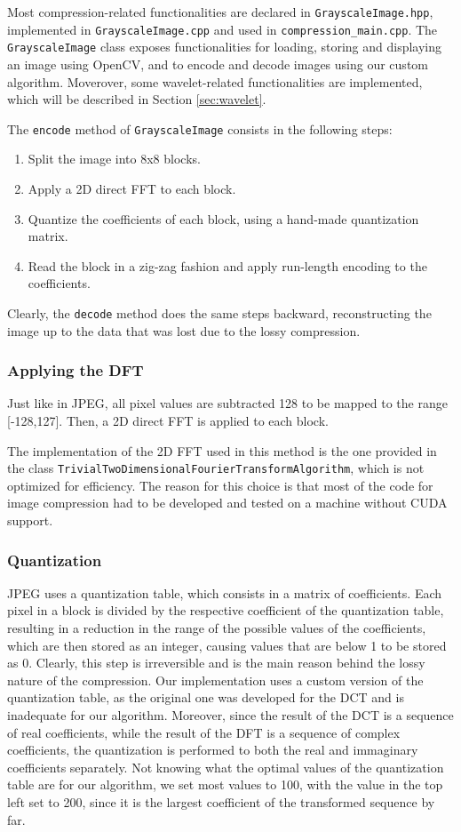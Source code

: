 Most compression-related functionalities are declared in \texttt{Grayscale\-Image.hpp}, implemented in \texttt{Grayscale\-Image.cpp} and used in \texttt{compression\_\-main\-.cpp}. The \texttt{GrayscaleImage} class exposes functionalities for loading, storing and displaying an image using OpenCV, and to encode and decode images using our custom algorithm. Moverover, some wavelet-related functionalities are implemented, which will be described in Section \ref{sec:wavelet}.

The \texttt{encode} method of \texttt{Grayscale\-Image} consists in the following steps:
\begin{enumerate}
    \item Split the image into 8x8 blocks.
    \item Apply a 2D direct FFT to each block.
    \item Quantize the coefficients of each block, using a hand-made quantization matrix.
    \item Read the block in a zig-zag fashion and apply run-length encoding to the coefficients.
\end{enumerate}
Clearly, the \texttt{decode} method does the same steps backward, reconstructing the image up to the data that was lost due to the lossy compression.

\subsubsection{Applying the DFT}
Just like in JPEG, all pixel values are subtracted 128 to be mapped to the range [-128,127]. Then, a 2D direct FFT is applied to each block.

The implementation of the 2D FFT used in this method is the one provided in the class \texttt{Trivial\-Two\-Dimensional\-Fourier\-Transform\-Algorithm}, which is not optimized for efficiency. The reason for this choice is that most of the code for image compression had to be developed and tested on a machine without CUDA support.

\subsubsection{Quantization}
JPEG uses a quantization table, which consists in a matrix of coefficients. Each pixel in a block is divided by the respective coefficient of the quantization table, resulting in a reduction in the range of the possible values of the coefficients, which are then stored as an integer, causing values that are below 1 to be stored as 0. Clearly, this step is irreversible and is the main reason behind the lossy nature of the compression. Our implementation uses a custom version of the quantization table, as the original one was developed for the DCT and is inadequate for our algorithm. Moreover, since the result of the DCT is a sequence of real coefficients, while the result of the DFT is a sequence of complex coefficients, the quantization is performed to both the real and immaginary coefficients separately. Not knowing what the optimal values of the quantization table are for our algorithm, we set most values to 100, with the value in the top left set to 200, since it is the largest coefficient of the transformed sequence by far.


